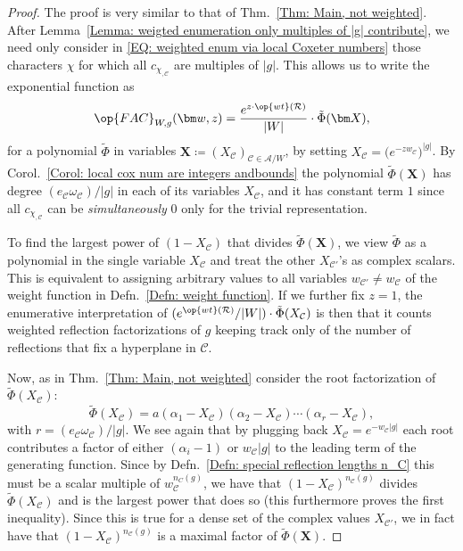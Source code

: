 \begin{proof}
The proof is very similar to that of Thm.~\ref{Thm: Main, not weighted}. After Lemma~\ref{Lemma: weigted enumeration only multiples of |g| contribute}, we need only consider in \eqref{EQ: weighted enum via local Coxeter numbers} those characters $\chi$ for which all $c_{\chi_{,\mathcal{C}}}$ are multiples of $|g|$. This allows us to write the exponential function as $$\op{FAC}_{W,g}(\bm w,z)=\dfrac{e^{z\cdot\op{wt}(\mathcal{R})}}{|W|}\cdot\tilde{\Phi}(\bm X),$$ for a polynomial $\tilde{\Phi}$ in variables $\bm X\coloneqq (X_{\mathcal{C}})_{\mathcal{C}\in\mathcal{A}/W}$, by setting $X_{\mathcal{C}}=\big( e^{-zw_{\mathcal{C}}^{\phantom{l_r}}}\big)^{|g|}$. By Corol.~\ref{Corol: local cox num are integers andbounds} the polynomial $\tilde{\Phi}(\bm X)$ has degree $(e_{\mathcal{C}}\omega_{\mathcal{C}})/|g|$ in each of its variables $X_{\mathcal{C}}$, and it has constant term $1$ since all $c_{\chi_{,\mathcal{C}}}$ can be {\it simultaneously} $0$ only for the trivial representation.

To find the largest power of $(1-X_{\mathcal{C}})$ that divides $\tilde{\Phi}(\bm X)$, we view $\tilde{\Phi}$ as a polynomial in the single variable $X_{\mathcal{C}}$ and treat the other $X_{\mathcal{C}'}$'s as complex scalars. This is equivalent to assigning arbitrary values to all variables $w_{\mathcal{C}'}\neq w_{\mathcal{C}}$ of the weight function in Defn.~\ref{Defn: weight function}. If we further fix $z=1$, the enumerative interpretation of $(e^{\op{wt}(\mathcal{R})}/|W|)\cdot\tilde{\Phi}(X_{\mathcal{C}})$ is then that it counts weighted reflection factorizations of $g$ keeping track only of the number of reflections that fix a hyperplane in $\mathcal{C}$.

Now, as in Thm.~\ref{Thm: Main, not weighted} consider the root factorization of $\tilde{\Phi}(X_{\mathcal{C}})$: $$\tilde{\Phi}(X_{\mathcal{C}})=a(\alpha_1-X_\mathcal{C})(\alpha_2-X_{\mathcal{C}})\cdots (\alpha_r-X_{\mathcal{C}}),$$ with $r=(e_{\mathcal{C}}\omega_{\mathcal{C}})/|g|$. We see again that by plugging back $X_{\mathcal{C}}=e^{-w_{\mathcal{C}}|g|}$ each root contributes a factor of either $(\alpha_i-1)$ or $w_{\mathcal{C}}|g|$ to the leading term of the generating function. Since by Defn.~\ref{Defn: special reflection lengths n_C} this must be a scalar multiple of $w_{\mathcal{C}}^{n_C(g)}$, we have that $(1-X_{\mathcal{C}})^{n_{\mathcal{C}}(g)}$ divides $\tilde{\Phi}(X_{\mathcal{C}})$ and is the largest power that does so (this furthermore proves the first inequality). Since this is true for a dense set of the complex values $X_{\mathcal{C}'}$, we in fact have that $(1-X_{\mathcal{C}})^{n_{\mathcal{C}}(g)}$ is a maximal factor of $\tilde{\Phi}(\bm X)$.


\end{proof}
